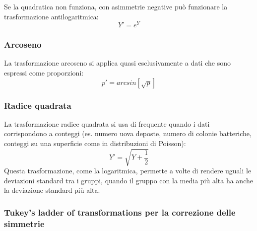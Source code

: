 \documentclass[10pt, draft]{book}
\begin{document}
Se la quadratica non funziona, con asimmetrie negative può funzionare la trasformazione antilogaritmica:
\begin{equation}
    Y' = e^Y
\end{equation}

\subsubsection{Arcoseno}

La trasformazione arcoseno si applica quasi esclusivamente a dati che sono espressi come proporzioni:
\begin{equation}
    p' = arcsin[\sqrt{p}]
\end{equation}


\subsubsection{Radice quadrata}

La trasformazione radice quadrata si usa di frequente quando i dati corrispondono a conteggi (es. numero uova deposte, numero di colonie batteriche, conteggi su una superficie come in distribuzioni di Poisson):
\begin{equation}
    Y' = \sqrt{Y+\frac{1}{2}}
\end{equation}
Questa trasformazione, come la logaritmica, permette a volte di rendere uguali le deviazioni standard tra i gruppi, quando il gruppo con la media più alta ha anche la deviazione standard più alta.

\subsubsection{Tukey's ladder of transformations per la correzione delle simmetrie}
\end{document}
